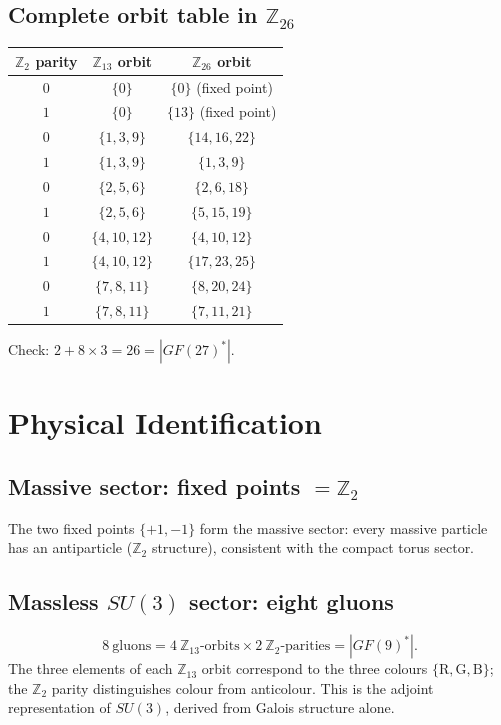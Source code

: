 \subsection{Complete orbit table in $\mathbb{Z}_{26}$ \BM}

\begin{center}
\begin{tabular}{ccc}
\toprule
$\mathbb{Z}_2$ parity & $\mathbb{Z}_{13}$ orbit & $\mathbb{Z}_{26}$ orbit \\
\midrule
$0$ & $\{0\}$       & $\{0\}$ (fixed point) \\
$1$ & $\{0\}$       & $\{13\}$ (fixed point) \\
$0$ & $\{1,3,9\}$   & $\{14,16,22\}$ \\
$1$ & $\{1,3,9\}$   & $\{1,3,9\}$ \\
$0$ & $\{2,5,6\}$   & $\{2,6,18\}$ \\
$1$ & $\{2,5,6\}$   & $\{5,15,19\}$ \\
$0$ & $\{4,10,12\}$ & $\{4,10,12\}$ \\
$1$ & $\{4,10,12\}$ & $\{17,23,25\}$ \\
$0$ & $\{7,8,11\}$  & $\{8,20,24\}$ \\
$1$ & $\{7,8,11\}$  & $\{7,11,21\}$ \\
\bottomrule
\end{tabular}
\end{center}

Check: $2+8\times3=26=|GF(27)^*|$.~\checkmark

\section{Physical Identification \KM}

\subsection{Massive sector: fixed points $=\mathbb{Z}_2$}

The two fixed points $\{+1,-1\}$ form the massive sector: every massive particle
has an antiparticle ($\mathbb{Z}_2$ structure), consistent with the compact
torus sector.

\subsection{Massless $SU(3)$ sector: eight gluons}

\[
8\ \text{gluons}
=4\ \mathbb{Z}_{13}\text{-orbits}\times2\ \mathbb{Z}_2\text{-parities}
=|GF(9)^*|.
\]
The three elements of each $\mathbb{Z}_{13}$ orbit correspond to the three
colours $\{\mathrm{R},\mathrm{G},\mathrm{B}\}$; the $\mathbb{Z}_2$ parity
distinguishes colour from anticolour. This is the adjoint representation of
$SU(3)$, derived from Galois structure alone.


